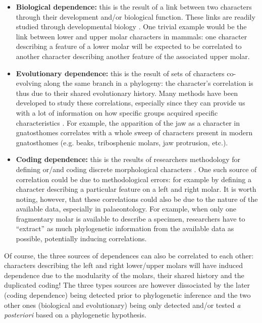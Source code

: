 \documentclass[12pt,letterpaper]{article}
\begin{document}
\begin{itemize}

    \item \textbf{Biological dependence:} this is the result of a link between two characters through their development and/or biological function.
    These links are readily studied through developmental biology \citep{goswami2006morphological,goswami2010,goswami2014macroevolutionary}.
    One trivial example would be the link between lower and upper molar characters in mammals: one character describing a feature of a lower molar will be expected to be correlated to another character describing another feature of the associated upper molar.

    \item \textbf{Evolutionary dependence:} this is the result of sets of characters co-evolving along the same branch in a phylogeny: the character's correlation is thus due to their shared evolutionary history.
    Many methods have been developed to study these correlations, especially since they can provide us with a lot of information on how specific groups acquired specific characteristics \citep{Lande1983,Maddison1990,Pagel1994,Pagel2006,Grabowski2016}.
    For example, the apparition of the jaw as a character in gnatosthomes correlates with a whole sweep of characters present in modern gnatosthomes (e.g. beaks, tribosphenic molars, jaw protrusion, etc.). %

    \item \textbf{Coding dependence:} this is the results of researchers methodology for defining or/and coding discrete morphological characters \citep{Brazeau2011,simoes2017giant}.
    One such source of correlation could be due to methodological errors: for example by defining a character describing a particular feature on a left and right molar.
    It is worth noting, however, that these correlations could also be due to the nature of the available data, especially in palaeontology.
    For example, when only one fragmentary molar is available to describe a specimen, researchers have to ``extract'' as much phylogenetic information from the available data as possible, potentially inducing correlations.
\end{itemize}

\noindent Of course, the three sources of dependences can also be correlated to each other: characters describing the left and right lower/upper molars will have induced dependence due to the modularity of the molars, their shared history and the duplicated coding!
The three types sources are however dissociated by the later (coding dependence) being detected prior to phylogenetic inference and the two other ones (biological and evolutionary) being only detected and/or tested \textit{a posteriori} based on a phylogenetic hypothesis.
\end{document}
